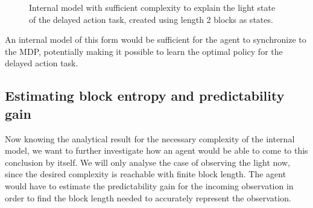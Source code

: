 \documentclass[12pt,a4paper]{article}
\begin{document}
\begin{figure}[H]
    \hspace{2cm}
    \caption{\label{fig:mp1_L2} Internal model with sufficient complexity to explain the light state of the delayed action task, created using length 2 blocks as states.}
\end{figure}

An internal model of this form would be sufficient for the agent to synchronize to the MDP, potentially making it possible to learn the optimal policy for the delayed action task.

\subsection{Estimating block entropy and predictability gain} \label{ssec:est_block_and_pred_gain}
Now knowing the analytical result for the necessary complexity of the internal model, we want to further investigate how an agent would be able to come to this conclusion by itself.
We will only analyse the case of observing the light now, since the desired complexity is reachable with finite block length.
The agent would have to estimate the predictability gain for the incoming observation in order to find the block length needed to accurately represent the observation.
\end{document}
